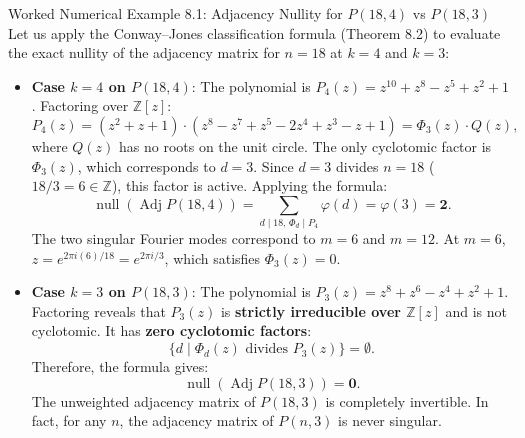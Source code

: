 \documentclass[11pt]{article}
\begin{document}
\begin{callbox}{Worked Numerical Example 8.1: Adjacency Nullity for $P(18, 4)$ vs $P(18, 3)$}
Let us apply the Conway--Jones classification formula (Theorem 8.2) to evaluate the exact nullity of the adjacency matrix for $n=18$ at $k=4$ and $k=3$:
\begin{itemize}[leftmargin=*,nosep]
  \item \textbf{Case $k=4$ on $P(18, 4)$}:
  The polynomial is $P_4(z) = z^{10} + z^8 - z^5 + z^2 + 1$.
  Factoring over $\mathbb{Z}[z]$:
  \begin{equation}
    P_4(z) = (z^2 + z + 1) \cdot (z^8 - z^7 + z^5 - 2z^4 + z^3 - z + 1) = \Phi_3(z) \cdot Q(z),
  \end{equation}
  where $Q(z)$ has no roots on the unit circle.
  The only cyclotomic factor is $\Phi_3(z)$, which corresponds to $d=3$.
  Since $d = 3$ divides $n = 18$ ($18 / 3 = 6 \in \mathbb{Z}$), this factor is active.
  Applying the formula:
  \begin{equation}
    \operatorname{null}(\operatorname{Adj} P(18, 4)) = \sum_{d \mid 18, \, \Phi_d \mid P_4} \varphi(d) = \varphi(3) = \mathbf{2}.
  \end{equation}
  The two singular Fourier modes correspond to $m = 6$ and $m = 12$.
  At $m=6$, $z = e^{2\pi i (6)/18} = e^{2\pi i / 3}$, which satisfies $\Phi_3(z) = 0$.

  \item \textbf{Case $k=3$ on $P(18, 3)$}:
  The polynomial is $P_3(z) = z^8 + z^6 - z^4 + z^2 + 1$.
  Factoring reveals that $P_3(z)$ is \textbf{strictly irreducible over $\mathbb{Z}[z]$} and is not cyclotomic.
  It has \textbf{zero cyclotomic factors}:
  \begin{equation}
    \{ d \mid \Phi_d(z) \text{ divides } P_3(z) \} = \emptyset.
  \end{equation}
  Therefore, the formula gives:
  \begin{equation}
    \operatorname{null}(\operatorname{Adj} P(18, 3)) = \mathbf{0}.
  \end{equation}
  The unweighted adjacency matrix of $P(18, 3)$ is completely invertible.
  In fact, for any $n$, the adjacency matrix of $P(n,3)$ is never singular.
\end{itemize}
\end{callbox}

\newpage

\end{document}
